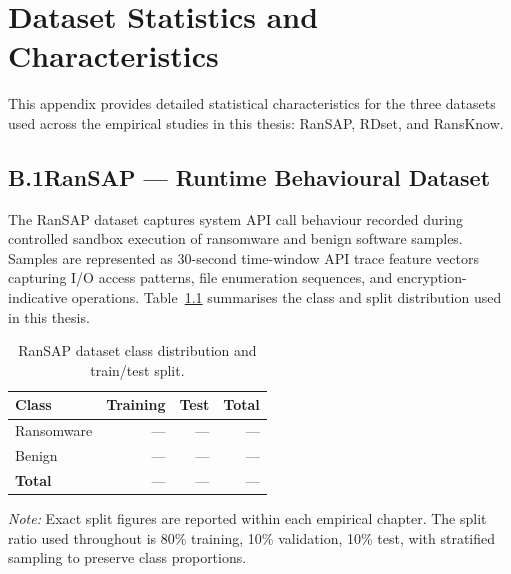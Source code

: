 
\chapter{Dataset Statistics and Characteristics}
\label{app:datasets}

This appendix provides detailed statistical characteristics for the three datasets used
across the empirical studies in this thesis: RanSAP, RDset, and RansKnow.

\section*{B.1\quad RanSAP — Runtime Behavioural Dataset}

The RanSAP dataset \cite{hirano2022ransap} captures system API call behaviour recorded
during controlled sandbox execution of ransomware and benign software samples.
Samples are represented as 30-second time-window API trace feature vectors capturing
I/O access patterns, file enumeration sequences, and encryption-indicative operations.
Table~\ref{tab:app_ransap} summarises the class and split distribution used in this thesis.

\begin{table}[ht]
\centering
\caption{RanSAP dataset class distribution and train/test split.}
\label{tab:app_ransap}
\begin{tabular}{@{}lrrr@{}}
\toprule
\textbf{Class} & \textbf{Training} & \textbf{Test} & \textbf{Total} \\
\midrule
Ransomware      & ---  & ---  & --- \\
Benign          & ---  & ---  & --- \\
\midrule
\textbf{Total}  & ---  & ---  & --- \\
\bottomrule
\end{tabular}
\end{table}

\noindent\textit{Note:} Exact split figures are reported within each empirical chapter.
The split ratio used throughout is 80\% training, 10\% validation, 10\% test, with
stratified sampling to preserve class proportions.


